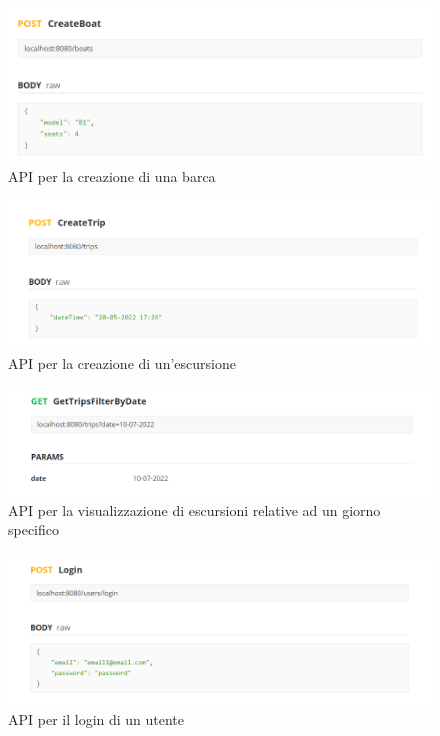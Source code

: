\begin{figure}[htbp]
    \includegraphics[width=\textwidth]{images/iterazione1/postman-api/CreateBoat.PNG}
    \centering
    \caption{API per la creazione di una barca}\label{creazione barca}
\end{figure}
\begin{figure}[htbp]
    \includegraphics[width=\textwidth]{images/iterazione1/postman-api/CreateTrip.PNG}
    \centering
    \caption{API per la creazione di un'escursione}
    \label{creazione escursione}
\end{figure}
\begin{figure}[htbp]
    \includegraphics[width=\textwidth]{images/iterazione1/postman-api/GetTripFilterByDate.PNG}
    \centering
    \caption{API per la visualizzazione di escursioni relative ad un giorno specifico}
    \label{trip}
\end{figure}
\begin{figure}[htbp]
    \includegraphics[width=\textwidth]{images/iterazione1/postman-api/Login.PNG}
    \centering
    \caption{API per il login di un utente}
    \label{login}
\end{figure}
